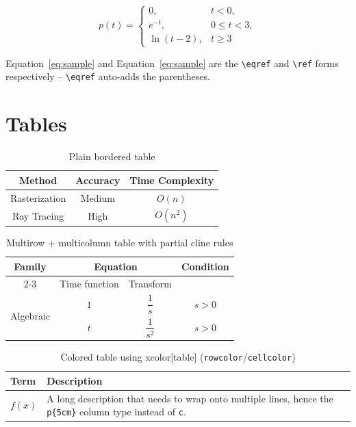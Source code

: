 \documentclass{article}
\begin{document}
\[
p(t) = \begin{cases}
    0, & t < 0, \\
    e^{-t}, & 0 \le t < 3, \\
    \ln(t-2), & t \ge 3
\end{cases}
\]

Equation~\eqref{eq:sample} and Equation~\ref{eq:sample} are the \verb|\eqref|
and \verb|\ref| forms respectively -- \verb|\eqref| auto-adds the parentheses.

\section{Tables}

\begin{table}[H]
    \centering
    \begin{tabular}{|c|c|c|}
        \hline
        Method & Accuracy & Time Complexity \\
        \hline
        Rasterization & Medium & $O(n)$ \\
        \hline
        Ray Tracing & High & $O(n^2)$ \\
        \hline
    \end{tabular}
    \caption{Plain bordered table}
    \label{tab:plain}
\end{table}

\begin{table}[H]
    \centering
    \renewcommand{\arraystretch}{1.5} %
    \begin{tabular}{|c|c|c|c|}
        \hline
        \multirow{2}{*}{\textbf{Family}} & \multicolumn{2}{c|}{\textbf{Equation}} & \multirow{2}{*}{\textbf{Condition}} \\
        \cline{2-3}
        & Time function & Transform & \\
        \hline
        \multirow{2}{*}{Algebraic} & $1$ & $\dfrac{1}{s}$ & $s>0$ \\
        \cline{2-4}
        & $t$ & $\dfrac{1}{s^2}$ & $s>0$ \\
        \hline
    \end{tabular}
    \caption{Multirow + multicolumn table with partial cline rules}
    \label{tab:multi}
\end{table}

\begin{table}[H]
    \centering
    \begin{tabular}{|l|p{5cm}|}
        \hline
        \rowcolor{gray!25}
        \textbf{Term} & \textbf{Description} \\
        \hline
        $f(x)$ & \cellcolor{blue!10} A long description that needs to wrap onto
        multiple lines, hence the \texttt{p\{5cm\}} column type instead of \texttt{c}. \\
        \hline
    \end{tabular}
    \caption{Colored table using xcolor[table] (\texttt{rowcolor}/\texttt{cellcolor})}
    \label{tab:colored}
\end{table}
\end{document}
